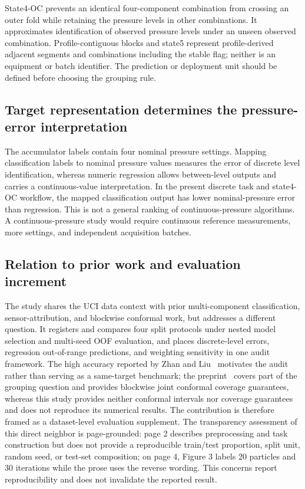\documentclass[11pt,a4paper]{article}
\begin{document}
State4-OC prevents an identical four-component combination from crossing an outer fold while retaining the pressure levels in other combinations. It approximates identification of observed pressure levels under an unseen observed combination. Profile-contiguous blocks and state5 represent profile-derived adjacent segments and combinations including the stable flag; neither is an equipment or batch identifier. The prediction or deployment unit should be defined before choosing the grouping rule.

\subsection{Target representation determines the pressure-error interpretation}
The accumulator labels contain four nominal pressure settings. Mapping classification labels to nominal pressure values measures the error of discrete level identification, whereas numeric regression allows between-level outputs and carries a continuous-value interpretation. In the present discrete task and state4-OC workflow, the mapped classification output has lower nominal-pressure error than regression. This is not a general ranking of continuous-pressure algorithms. A continuous-pressure study would require continuous reference measurements, more settings, and independent acquisition batches.

\subsection{Relation to prior work and evaluation increment}
The study shares the UCI data context with prior multi-component classification, sensor-attribution, and blockwise conformal work, but addresses a different question. It registers and compares four split protocols under nested model selection and multi-seed OOF evaluation, and places discrete-level errors, regression out-of-range predictions, and weighting sensitivity in one audit framework. The high accuracy reported by Zhan and Liu~\cite{zhan} motivates the audit rather than serving as a same-target benchmark; the preprint~\cite{bui} covers part of the grouping question and provides blockwise joint conformal coverage guarantees, whereas this study provides neither conformal intervals nor coverage guarantees and does not reproduce its numerical results. The contribution is therefore framed as a dataset-level evaluation supplement. The transparency assessment of this direct neighbor is page-grounded: page 2 describes preprocessing and task construction but does not provide a reproducible train/test proportion, split unit, random seed, or test-set composition; on page 4, Figure 3 labels 20 particles and 30 iterations while the prose uses the reverse wording. This concerns report reproducibility and does not invalidate the reported result.
\end{document}

